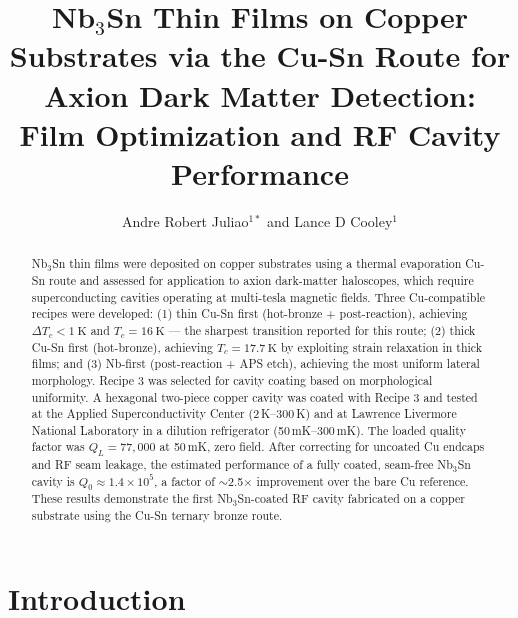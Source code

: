 \documentclass{iopjournal}
\begin{document}

\title{Nb$_3$Sn Thin Films on Copper Substrates via the Cu-Sn Route for Axion Dark Matter Detection: Film Optimization and RF Cavity Performance}

\author{Andre Robert Juliao$^{1*}$ and Lance D Cooley$^{1}$}





\begin{abstract}
Nb$_3$Sn thin films were deposited on copper substrates using a thermal evaporation Cu-Sn route and assessed for application to axion dark-matter haloscopes, which require superconducting cavities operating at multi-tesla magnetic fields. Three Cu-compatible recipes were developed: (1) thin Cu-Sn first (hot-bronze + post-reaction), achieving $\Delta T_c < \qty{1}{\kelvin}$ and $T_c = \qty{16}{\kelvin}$ --- the sharpest transition reported for this route; (2) thick Cu-Sn first (hot-bronze), achieving $T_c = \qty{17.7}{\kelvin}$ by exploiting strain relaxation in thick films; and (3) Nb-first (post-reaction + APS etch), achieving the most uniform lateral morphology. Recipe 3 was selected for cavity coating based on morphological uniformity. A hexagonal two-piece copper cavity was coated with Recipe 3 and tested at the Applied Superconductivity Center (2\,K--300\,K) and at Lawrence Livermore National Laboratory in a dilution refrigerator (50\,mK--300\,mK). The loaded quality factor was $Q_L = 77{,}000$ at 50\,mK, zero field. After correcting for uncoated Cu endcaps and RF seam leakage, the estimated performance of a fully coated, seam-free Nb$_3$Sn cavity is $Q_0 \approx 1.4 \times 10^5$, a factor of $\sim$2.5$\times$ improvement over the bare Cu reference. These results demonstrate the first Nb$_3$Sn-coated RF cavity fabricated on a copper substrate using the Cu-Sn ternary bronze route.
\end{abstract}


\section{Introduction}
\end{document}
